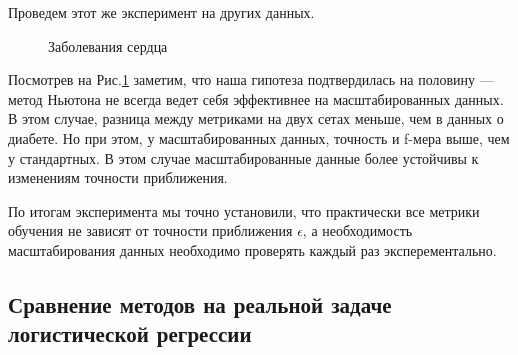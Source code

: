 \documentclass{article}
\begin{document}
	Проведем этот же эксперимент на других данных.
	
	\vspace{1.5cm}
	\begin{figure}[H]
		\centering
		\hfill %
		\caption{Заболевания сердца}
		\label{fig:heart}
	\end{figure}
	
	Посмотрев на Рис.\ref{fig:heart} заметим, что наша гипотеза подтвердилась на половину --- метод Ньютона не всегда ведет себя эффективнее на масштабированных данных. В этом случае, разница между метриками на двух сетах меньше, чем в данных о диабете. Но при этом, у масштабированных данных, точность и f-мера выше, чем у стандартных. В этом случае масштабированные данные более устойчивы к изменениям точности приближения.
	
	По итогам эксперимента мы точно установили, что практически все метрики обучения не зависят от точности приближения $\epsilon$, а необходимость масштабирования данных необходимо проверять каждый раз эксперементально.  
	
	\newpage
	\subsection{Сравнение методов на реальной задаче логистической регрессии}
	
\end{document}
